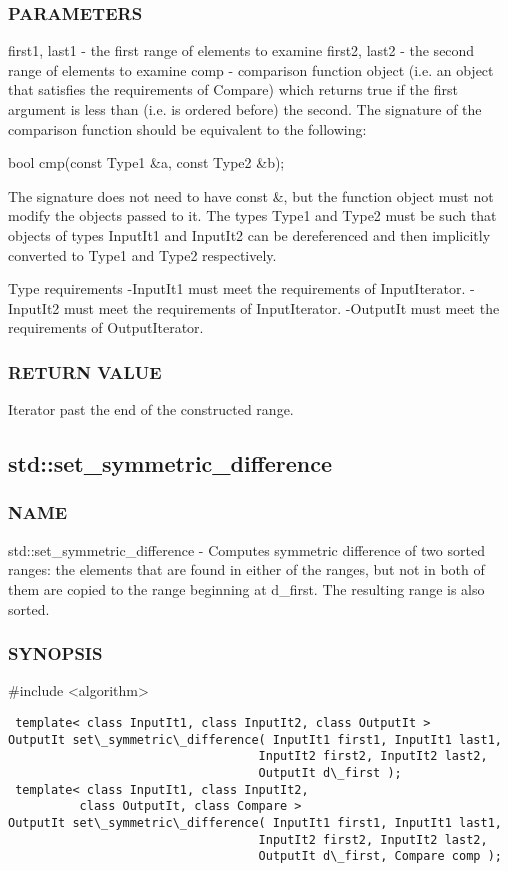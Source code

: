 \subsubsection{PARAMETERS}
first1, last1 - the first range of elements to examine
first2, last2 - the second range of elements to examine
comp - comparison function object (i.e. an object that satisfies the requirements of Compare) which returns true if the first argument is less than (i.e. is ordered before) the second.
The signature of the comparison function should be equivalent to the following:

 bool cmp(const Type1 \&a, const Type2 \&b);

The signature does not need to have const \&, but the function object must not modify the objects passed to it.
The types Type1 and Type2 must be such that objects of types InputIt1 and InputIt2 can be dereferenced and then implicitly converted to Type1 and Type2 respectively.

 Type requirements
 -InputIt1 must meet the requirements of InputIterator.
 -InputIt2 must meet the requirements of InputIterator.
 -OutputIt must meet the requirements of OutputIterator.

\subsubsection{RETURN VALUE}
Iterator past the end of the constructed range.



\subsection{std::set\_symmetric\_difference}

\subsubsection{NAME}
std::set\_symmetric\_difference - Computes symmetric difference of two sorted ranges: the elements that are found in either of the ranges, but not in both of them are copied to the range beginning at d\_first. The resulting range is also sorted.

\subsubsection{SYNOPSIS}
\#include <algorithm>

\begin{lstlisting}
 template< class InputIt1, class InputIt2, class OutputIt >
OutputIt set\_symmetric\_difference( InputIt1 first1, InputIt1 last1,
                                   InputIt2 first2, InputIt2 last2,
                                   OutputIt d\_first );
 template< class InputIt1, class InputIt2,
          class OutputIt, class Compare >
OutputIt set\_symmetric\_difference( InputIt1 first1, InputIt1 last1,
                                   InputIt2 first2, InputIt2 last2,
                                   OutputIt d\_first, Compare comp );
\end{lstlisting}

